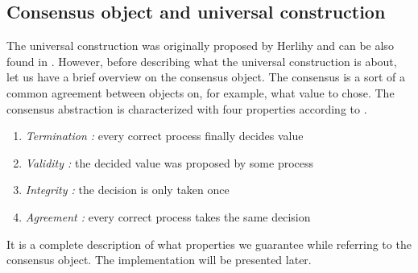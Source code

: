 \documentclass{article}
\theoremstyle{remark}
\begin{document}
\subsection{Consensus object and universal construction}
The universal construction was originally proposed by Herlihy and can be also found in \cite{Herlihy:2008:AMP:1734069}. However, before describing what the universal construction is about, let us have a brief overview on the consensus object. The consensus is a sort of a common agreement between objects on, for example, what value to chose.
The consensus abstraction is characterized with four properties according to \cite{Guerraoui:2010:IRD:1951643}.
\begin{enumerate}
\item \emph{Termination :} every correct process finally decides value
\item \emph{Validity :} the decided value was proposed by some process
\item \emph{Integrity :} the decision is only taken once
\item \emph{Agreement :} every correct process takes the same decision
\end{enumerate}
It is a complete description of what properties we guarantee while referring to the consensus object. The implementation will be presented later.
\end{document}
